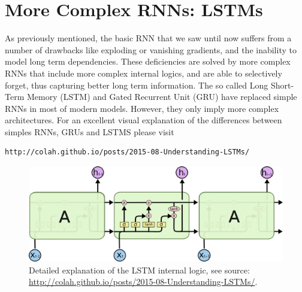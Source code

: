 \section{More Complex RNNs: LSTMs}

As previously mentioned, the basic RNN that we saw until now suffers from a
number of drawbacks like exploding or vanishing gradients, and the inability to
model long term dependencies. These deficiencies are solved by more complex
RNNs that include more complex internal logics, and are able to selectively
forget, thus capturing better long term information. The so called Long Short-Term Memory
(LSTM) and Gated Recurrent Unit (GRU) have replaced simple RNNs in most of modern
models. However, they only imply more complex architectures. For an excellent 
visual explanation of the differences between simples RNNs, GRUs and LSTMS please visit 

\begin{verbatim}
http://colah.github.io/posts/2015-08-Understanding-LSTMs/
\end{verbatim}

\begin{figure}[!h]
\centering
\includegraphics[scale=0.6]{figs/deep_learning/LSTM3-chain.png}
\caption{Detailed explanation of the LSTM internal logic, see source: \url{http://colah.github.io/posts/2015-08-Understanding-LSTMs/}.}
\label{fig:RNN}
\end{figure}

